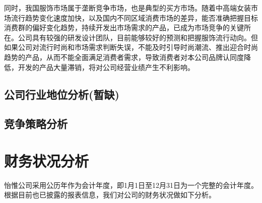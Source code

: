 同时，我国服饰市场属于垄断竞争市场，也是典型的买方市场。随着中高端女装市场流行趋势变化速度加快，以及国内不同区域消费市场的差异，能否准确把握目标消费群的偏好变化趋势，持续开发出市场需求的产品，已成为市场竞争的关键所在。公司具有较强的研发设计团队，目前能够较好的预测和把握服饰流行动向。但如果公司对流行时尚和市场需求判断失误，不能及时引导时尚潮流、推出迎合时尚趋势的产品，从而不能全面满足消费者需求，导致消费者对本公司品牌认同度降低，开发的产品大量滞销，将对公司经营业绩产生不利影响。

\subsection{公司行业地位分析(暂缺)}

\subsection{竞争策略分析}


\section{财务状况分析}
怡惟公司采用公历年作为会计年度，即1月1日至12月31日为一个完整的会计年度。根据目前也已披露的报表信息，我们对公司的财务状况做如下分析。


